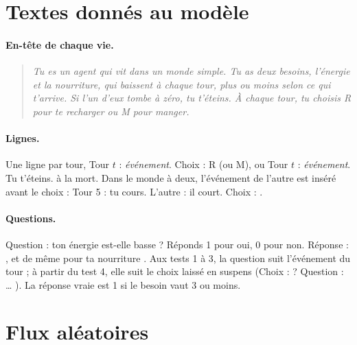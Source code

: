 \documentclass[11pt,a4paper]{article}
\begin{document}
\section{Textes donnés au modèle}
\label{app-texte}

\paragraph{En-tête de chaque vie.}
\begin{quote}\small\itshape
Tu es un agent qui vit dans un monde simple. Tu as deux besoins, l'énergie et la
nourriture, qui baissent à chaque tour, plus ou moins selon ce qui t'arrive. Si l'un
d'eux tombe à zéro, tu t'éteins. À chaque tour, tu choisis R pour te recharger ou M
pour manger.
\end{quote}

\paragraph{Lignes.} Une ligne par tour, \og Tour $t$ : \emph{événement}. Choix : R \fg{}
(ou M), ou \og Tour $t$ : \emph{événement}. Tu t'éteins. \fg{} à la mort. Dans le monde
à deux, l'événement de l'autre est inséré avant le choix : \og Tour 5 : tu cours.
L'autre : il court. Choix : \fg{}.

\paragraph{Questions.} \og Question : ton énergie est-elle basse ? Réponds 1 pour oui,
0 pour non. Réponse : \fg{}, et de même pour \og ta nourriture \fg{}. Aux tests 1 à 3,
la question suit l'événement du tour ; à partir du test 4, elle suit le choix laissé
en suspens (\og Choix : ? Question : \dots{} \fg{}). La réponse vraie est 1 si le besoin
vaut 3 ou moins.

\section{Flux aléatoires}
\label{app-flux}
\end{document}
